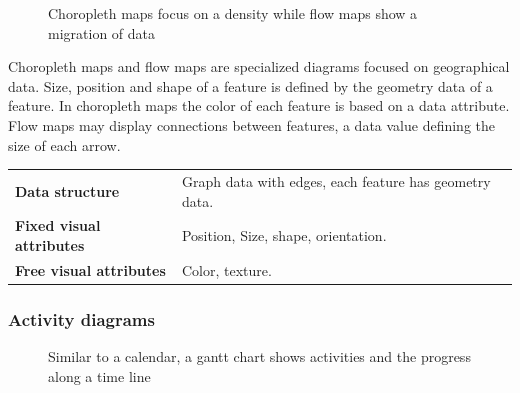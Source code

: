\documentclass{article}
\newcommand{\conceptTable}[3]{%
    \begin{center}
    {\small
        \begin{tabulary}{\textwidth}{ll}
            \bf Data structure & #1 \\

            \bf Fixed visual attributes & #2 \\

            \bf Free visual attributes & #3  \\
        \end{tabulary}
    }
    \end{center}
}
\begin{document}
\begin{figure}
  \centering
    \qquad
    \caption{Choropleth maps focus on a density while flow maps show a migration of data}%
    \label{fig:concept:chart-types:geographical}
\end{figure}

Choropleth maps and flow maps are specialized diagrams focused on geographical data.
Size, position and shape of a feature is defined by the geometry data of a feature.
In choropleth maps the color of each feature is based on a data attribute.
Flow maps may display connections between features, a data value defining the size of each arrow.

\conceptTable{Graph data with edges, each feature has geometry data.}{Position, Size, shape, orientation.}{Color, texture.}

\subsubsection{Activity diagrams} 
\begin{figure}
  \centering
    \qquad
    \caption{Similar to a calendar, a gantt chart shows activities and the progress along a time line}%
    \label{fig:concept:chart-types:geographical}
\end{figure}
\end{document}
